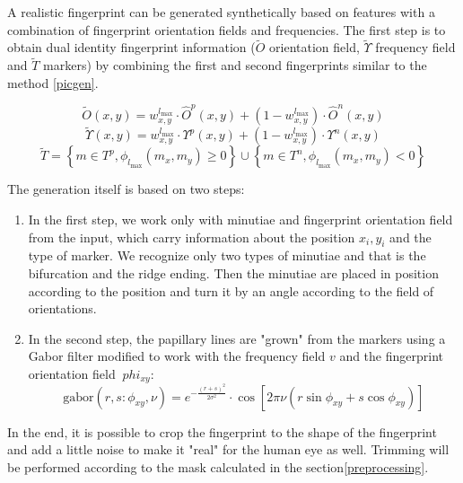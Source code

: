 A realistic fingerprint can be generated synthetically based on features with a combination of fingerprint orientation fields and frequencies. The first step is to obtain dual identity fingerprint information ($ \tilde{O} $ orientation field, $ \tilde{\Upsilon} $ frequency field and $ \tilde{T} $ markers) by combining the first and second fingerprints similar to the method \ref{picgen}. \cite{morphing_paper}

\begin{equation}
    \tilde{O}(x, y)=w_{x, y}^{l_{\max }} \cdot \hat{O}^{p}(x, y)+\left(1-w_{x, y}^{l_{\max }}\right) \cdot \hat{O}^{n}(x, y)
\end{equation}
\begin{equation}
    \tilde{\Upsilon}(x, y)=w_{x, y}^{l_{\max }} \cdot \Upsilon^{p}(x, y)+\left(1-w_{x, y}^{l_{\max }}\right) \cdot \Upsilon^{n}(x, y)
\end{equation}
\begin{equation}
\tilde{T}=\left\{m \in T^{p}, \phi_{l_{\max }}\left(m_{x}, m_{y}\right) \geq 0\right\} 
\cup\left\{m \in T^{n}, \phi_{l_{\max }}\left(m_{x}, m_{y}\right)<0\right\}
\end{equation}

The generation itself is based on two steps:

\begin{enumerate}
    \item In the first step, we work only with minutiae and fingerprint orientation field from the input, which carry information about the position $ x_i, y_i $ and the type of marker. We recognize only two types of minutiae and that is the bifurcation and the ridge ending. Then the minutiae are placed in position according to the position and turn it by an angle according to the field of orientations.\cite{syntetic_gen_paper}
    
    \item In the second step, the papillary lines are "grown" from the markers using a Gabor filter modified to work with the frequency field $v$ and the fingerprint orientation field $ \ phi_{x y} $:\cite{syntetic_gen_paper}
    \begin{equation}
        \text{gabor}\left(r, s: \phi_{x y}, \nu\right)=e^{-\frac{(r+s)^{2}}{2 \sigma^{2}}} \cdot \cos \left[2 \pi \nu\left(r \sin \phi_{x y}+s \cos \phi_{x y}\right)\right]
    \end{equation}
\end{enumerate}

In the end, it is possible to crop the fingerprint to the shape of the fingerprint and add a little noise to make it "real" for the human eye as well. Trimming will be performed according to the mask calculated in the section\ref{preprocessing}.

